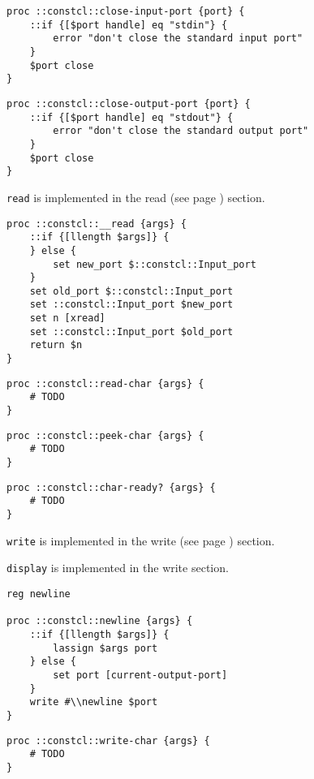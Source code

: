 \documentclass{report}
\begin{document}
\noindent\makebox[\linewidth]{\rule{\linewidth}{0.4pt}}
\noindent\makebox[\linewidth]{\rule{\linewidth}{0.4pt}}
\begin{lstlisting}
proc ::constcl::close-input-port {port} {
    ::if {[$port handle] eq "stdin"} {
        error "don't close the standard input port"
    }
    $port close
}
\end{lstlisting}
\noindent\makebox[\linewidth]{\rule{\linewidth}{0.4pt}}
\noindent\makebox[\linewidth]{\rule{\linewidth}{0.4pt}}
\begin{lstlisting}
proc ::constcl::close-output-port {port} {
    ::if {[$port handle] eq "stdout"} {
        error "don't close the standard output port"
    }
    $port close
}
\end{lstlisting}
\noindent\makebox[\linewidth]{\rule{\linewidth}{0.4pt}}

\texttt{read} is implemented in the read (see page \pageref{read}) section.

\noindent\makebox[\linewidth]{\rule{\linewidth}{0.4pt}}
\begin{lstlisting}
proc ::constcl::__read {args} {
    ::if {[llength $args]} {
    } else {
        set new_port $::constcl::Input_port
    }
    set old_port $::constcl::Input_port
    set ::constcl::Input_port $new_port
    set n [xread]
    set ::constcl::Input_port $old_port
    return $n
}
\end{lstlisting}
\noindent\makebox[\linewidth]{\rule{\linewidth}{0.4pt}}
\noindent\makebox[\linewidth]{\rule{\linewidth}{0.4pt}}
\begin{lstlisting}
proc ::constcl::read-char {args} {
    # TODO
}
\end{lstlisting}
\noindent\makebox[\linewidth]{\rule{\linewidth}{0.4pt}}
\noindent\makebox[\linewidth]{\rule{\linewidth}{0.4pt}}
\begin{lstlisting}
proc ::constcl::peek-char {args} {
    # TODO
}
\end{lstlisting}
\noindent\makebox[\linewidth]{\rule{\linewidth}{0.4pt}}
\noindent\makebox[\linewidth]{\rule{\linewidth}{0.4pt}}
\begin{lstlisting}
proc ::constcl::char-ready? {args} {
    # TODO
}
\end{lstlisting}
\noindent\makebox[\linewidth]{\rule{\linewidth}{0.4pt}}

\texttt{write} is implemented in the write (see page \pageref{write}) section.


\texttt{display} is implemented in the write section.

\noindent\makebox[\linewidth]{\rule{\linewidth}{0.4pt}}
\begin{lstlisting}
reg newline
 
proc ::constcl::newline {args} {
    ::if {[llength $args]} {
        lassign $args port
    } else {
        set port [current-output-port]
    }
    write #\\newline $port
}
\end{lstlisting}
\noindent\makebox[\linewidth]{\rule{\linewidth}{0.4pt}}
\noindent\makebox[\linewidth]{\rule{\linewidth}{0.4pt}}
\begin{lstlisting}
proc ::constcl::write-char {args} {
    # TODO
}
\end{lstlisting}
\noindent\makebox[\linewidth]{\rule{\linewidth}{0.4pt}}
\end{document}
